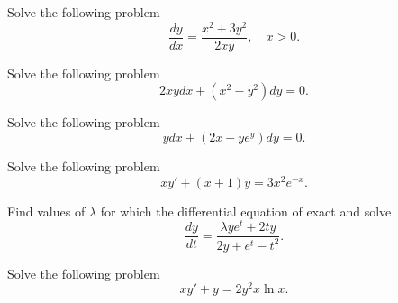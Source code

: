 \documentclass[11pt]{article}
\begin{document}
\makelabtitle





\begin{problem}
Solve the following problem
\begin{equation*}
\frac{dy}{dx}=\frac{x^{2}+3y^{2}}{2xy}, \quad x>0. 
\end{equation*}
\end{problem}


\begin{problem}
Solve the following problem
\begin{equation*}
2xy dx+(x^{2}-y^{2})dy=0. 
\end{equation*}
\end{problem}

\begin{problem}
Solve the following problem
\begin{equation*}
ydx + (2x - y e^{y}) dy = 0.
\end{equation*}
\end{problem}


\begin{problem}
Solve the following problem
\begin{equation*}
     xy'+(x+1)y=3x^{2}e^{-x}.
\end{equation*}
\end{problem}


\begin{problem}
Find values of $\lambda$ for which the differential equation of exact and solve
\[\dfrac{dy}{dt}=\frac{\lambda y e^{t}+ 2ty}{2y+e^{t}-t^{2}}.\]
\end{problem}





\begin{problem}
Solve the following problem
\begin{equation*}
 x y' + y = 2 y^{2}x \ln x.
\end{equation*}
\end{problem}
\end{document}

